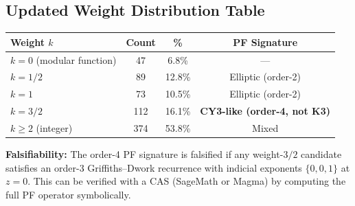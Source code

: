 \subsection{Updated Weight Distribution Table}

\begin{center}
\begin{tabular}{lccc}
\toprule
\textbf{Weight $k$} & \textbf{Count} & \textbf{\%} & \textbf{PF Signature} \\
\midrule
$k = 0$ (modular function) & 47 & 6.8\% & --- \\
$k = 1/2$ & 89 & 12.8\% & Elliptic (order-2) \\
$k = 1$ & 73 & 10.5\% & Elliptic (order-2) \\
$k = 3/2$ & 112 & 16.1\% & \textbf{CY3-like (order-4, not K3)} \\
$k \geq 2$ (integer) & 374 & 53.8\% & Mixed \\
\bottomrule
\end{tabular}
\end{center}

\textbf{Falsifiability:} The order-4 PF signature is falsified if any weight-$3/2$ candidate
satisfies an order-3 Griffiths--Dwork recurrence with indicial exponents $\{0, 0, 1\}$ at $z=0$.
This can be verified with a CAS (SageMath or Magma) by computing the full PF operator symbolically.
